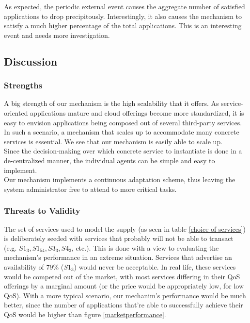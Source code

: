 \documentclass[10pt,journal,compsoc]{IEEEtran}
\begin{document}
As expected, the periodic external event causes the aggregate number of satisfied applications to drop precipitously. Interestingly, it also causes the mechanism to satisfy a much higher percentage of the total applications. This is an interesting event and needs more investigation.

\subsection{Discussion}

\subsubsection{Strengths}
A big strength of our mechanism is the high scalability that it offers. As service-oriented applications mature and cloud offerings become more standardized, it is easy to envision applications being composed out of several third-party services. In such a scenario, a mechanism that scales up to accommodate many concrete services is essential. We see that our mechanism is easily able to scale up.\\
Since the decision-making over which concrete service to instantiate is done in a de-centralized manner, the individual agents can be simple and easy to implement. \\    
Our mechanism implements a continuous adaptation scheme, thus leaving the system administrator free to attend to more critical tasks.

\subsubsection{Threats to Validity}

The set of services used to model the supply (as seen in table \ref{choice-of-services}) is deliberately seeded with services that probably will not be able to transact (e.g. $S1_{3}, S1_{54}, S3_{3}, S4_{3}$, etc.). This is done with a view to evaluating the mechanism's performance in an extreme situation. Services that advertise an availability of 79\% ($S1_{3}$) would never be acceptable.  In real life, these services would be competed out of the market, with most services differing in their QoS offerings by a marginal amount (or the price would be appropriately low, for low QoS). With a more typical scenario, our mechanim's performance would be much better, since the number of applications that're able to successfully achieve their QoS would be higher than figure \ref{marketperformance}.
\end{document}
